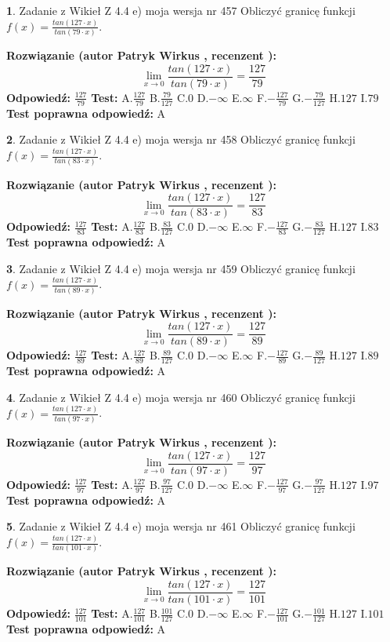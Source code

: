 \documentclass[12pt, a4paper]{article}
\theoremstyle{definition} %
\newtheorem{zad}{}
\newcommand{\zadStart}[1]{\begin{zad}#1\newline}
\newcommand{\zadStop}{\end{zad}}
\newcommand{\rozwStart}[2]{\noindent \textbf{Rozwiązanie (autor #1 , recenzent #2): }\newline}
\newcommand{\rozwStop}{\newline}
\newcommand{\odpStart}{\noindent \textbf{Odpowiedź:}\newline}
\newcommand{\odpStop}{\newline}
\newcommand{\testStart}{\noindent \textbf{Test:}\newline}
\newcommand{\testStop}{\newline}
\newcommand{\kluczStart}{\noindent \textbf{Test poprawna odpowiedź:}\newline}
\newcommand{\kluczStop}{\newline}
\begin{document}
\zadStart{Zadanie z Wikieł Z 4.4 e) moja wersja nr 457}
Obliczyć granicę funkcji $f(x)=\frac{tan(127\cdot x)}{tan(79\cdot x)}$.
\zadStop
\rozwStart{Patryk Wirkus}{}
$$\lim\limits_{x\to 0}\frac{tan(127\cdot x)}{tan(79\cdot x)}=
\frac{127}{79}$$
\rozwStop
\odpStart
$\frac{127}{79}$
\odpStop
\testStart
A.$\frac{127}{79}$
B.$\frac{79}{127}$
C.$0$
D.$-\infty$
E.$\infty$
F.$-\frac{127}{79}$
G.$-\frac{79}{127}$
H.$127$
I.$79$
\testStop
\kluczStart
A
\kluczStop



\zadStart{Zadanie z Wikieł Z 4.4 e) moja wersja nr 458}
Obliczyć granicę funkcji $f(x)=\frac{tan(127\cdot x)}{tan(83\cdot x)}$.
\zadStop
\rozwStart{Patryk Wirkus}{}
$$\lim\limits_{x\to 0}\frac{tan(127\cdot x)}{tan(83\cdot x)}=
\frac{127}{83}$$
\rozwStop
\odpStart
$\frac{127}{83}$
\odpStop
\testStart
A.$\frac{127}{83}$
B.$\frac{83}{127}$
C.$0$
D.$-\infty$
E.$\infty$
F.$-\frac{127}{83}$
G.$-\frac{83}{127}$
H.$127$
I.$83$
\testStop
\kluczStart
A
\kluczStop



\zadStart{Zadanie z Wikieł Z 4.4 e) moja wersja nr 459}
Obliczyć granicę funkcji $f(x)=\frac{tan(127\cdot x)}{tan(89\cdot x)}$.
\zadStop
\rozwStart{Patryk Wirkus}{}
$$\lim\limits_{x\to 0}\frac{tan(127\cdot x)}{tan(89\cdot x)}=
\frac{127}{89}$$
\rozwStop
\odpStart
$\frac{127}{89}$
\odpStop
\testStart
A.$\frac{127}{89}$
B.$\frac{89}{127}$
C.$0$
D.$-\infty$
E.$\infty$
F.$-\frac{127}{89}$
G.$-\frac{89}{127}$
H.$127$
I.$89$
\testStop
\kluczStart
A
\kluczStop



\zadStart{Zadanie z Wikieł Z 4.4 e) moja wersja nr 460}
Obliczyć granicę funkcji $f(x)=\frac{tan(127\cdot x)}{tan(97\cdot x)}$.
\zadStop
\rozwStart{Patryk Wirkus}{}
$$\lim\limits_{x\to 0}\frac{tan(127\cdot x)}{tan(97\cdot x)}=
\frac{127}{97}$$
\rozwStop
\odpStart
$\frac{127}{97}$
\odpStop
\testStart
A.$\frac{127}{97}$
B.$\frac{97}{127}$
C.$0$
D.$-\infty$
E.$\infty$
F.$-\frac{127}{97}$
G.$-\frac{97}{127}$
H.$127$
I.$97$
\testStop
\kluczStart
A
\kluczStop



\zadStart{Zadanie z Wikieł Z 4.4 e) moja wersja nr 461}
Obliczyć granicę funkcji $f(x)=\frac{tan(127\cdot x)}{tan(101\cdot x)}$.
\zadStop
\rozwStart{Patryk Wirkus}{}
$$\lim\limits_{x\to 0}\frac{tan(127\cdot x)}{tan(101\cdot x)}=
\frac{127}{101}$$
\rozwStop
\odpStart
$\frac{127}{101}$
\odpStop
\testStart
A.$\frac{127}{101}$
B.$\frac{101}{127}$
C.$0$
D.$-\infty$
E.$\infty$
F.$-\frac{127}{101}$
G.$-\frac{101}{127}$
H.$127$
I.$101$
\testStop
\kluczStart
A
\kluczStop
\end{document}
